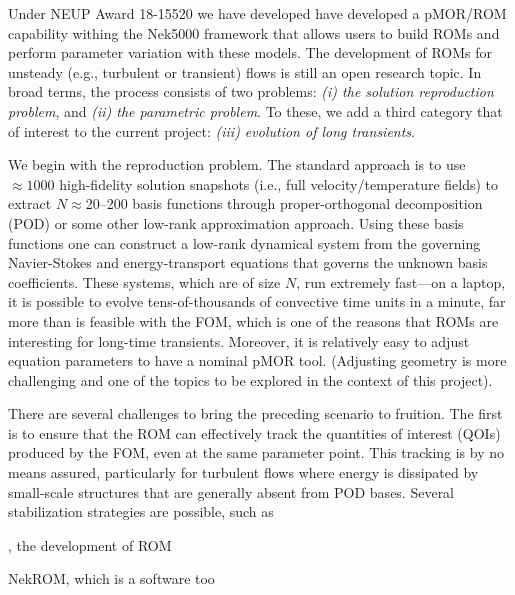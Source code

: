 Under NEUP Award 18-15520 we have developed have developed a pMOR/ROM
capability withing the Nek5000 framework that allows users to build ROMs and
perform parameter variation with these models.  The development of ROMs for
unsteady (e.g., turbulent or transient) flows is still an open research topic.
In broad terms, the process consists of two problems: {\em (i) the solution
reproduction problem}, and {\em (ii) the parametric problem}.  To these, we add
a third category that of interest to the current project: {\em (iii) evolution
of long transients}.

We begin with the reproduction problem. The standard approach is to use
$\approx 1000$ high-fidelity solution snapshots (i.e., full velocity/temperature
fields) to extract $N$$\approx$20--200 basis functions through 
proper-orthogonal decomposition (POD) or some other low-rank approximation
approach.  Using these basis functions one can construct a low-rank
dynamical system from the governing Navier-Stokes and energy-transport
equations that governs the unknown basis coefficients.  These systems,
which are of size $N$, run extremely fast---on a laptop, it is possible
to evolve tens-of-thousands of convective time units in a minute, far more than
is feasible with the FOM, which is one of the reasons that ROMs are interesting
for long-time transients.  Moreover, it is relatively easy to adjust equation
parameters to have a nominal pMOR tool.  (Adjusting geometry is more
challenging and one of the topics to be explored in the context of this
project).

There are several challenges to bring the preceding scenario to fruition.
The first is to ensure that the ROM can effectively track the quantities
of interest (QOIs) produced by the FOM, even at the same parameter point.
This tracking is by no means assured, particularly for turbulent flows
where energy is dissipated by small-scale structures that are generally
absent from POD bases.  Several stabilization strategies are possible,
such as 












, the development of ROM








NekROM, which is a software
too

